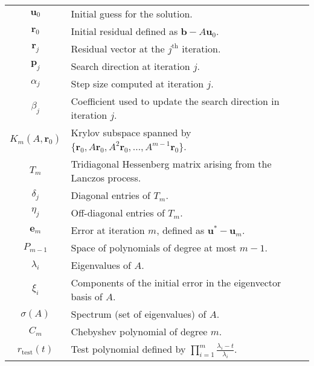\begin{longtable}{c p{10cm}}
    $\mathbf{u}_0$         & Initial guess for the solution.                                                                             \\
    $\mathbf{r}_0$         & Initial residual defined as $\mathbf{b}-A\mathbf{u}_0$.                                                     \\
    $\mathbf{r}_j$         & Residual vector at the $j^{\text{th}}$ iteration.                                                           \\
    $\mathbf{p}_j$         & Search direction at iteration $j$.                                                                          \\
    $\alpha_j$             & Step size computed at iteration $j$.                                                                        \\
    $\beta_j$              & Coefficient used to update the search direction in iteration $j$.                                           \\
    $K_m(A, \mathbf{r}_0)$ & Krylov subspace spanned by $\{\mathbf{r}_0, A\mathbf{r}_0, A^2\mathbf{r}_0, \ldots, A^{m-1}\mathbf{r}_0\}$. \\
    $T_m$                  & Tridiagonal Hessenberg matrix arising from the Lanczos process.                                             \\
    $\delta_j$             & Diagonal entries of $T_m$.                                                                                  \\
    $\eta_j$               & Off-diagonal entries of $T_m$.                                                                              \\
    $\mathbf{e}_m$         & Error at iteration $m$, defined as $\mathbf{u}^* - \mathbf{u}_m$.                                           \\
    $P_{m-1}$              & Space of polynomials of degree at most $m-1$.                                                               \\
    $\lambda_i$            & Eigenvalues of $A$.                                                                                         \\
    $\xi_i$                & Components of the initial error in the eigenvector basis of $A$.                                            \\
    $\sigma(A)$            & Spectrum (set of eigenvalues) of $A$.                                                                       \\
    $C_m$                  & Chebyshev polynomial of degree $m$.                                                                         \\
    $r_{\text{test}}(t)$   & Test polynomial defined by $\prod_{i=1}^m \frac{\lambda_i - t}{\lambda_i}$.                                 \\
\end{longtable}

